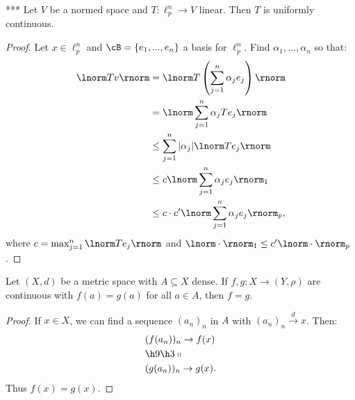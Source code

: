     \begin{corollary}***
        Let $V$ be a normed space and $T:\ell_p^n \rightarrow V$ linear. Then $T$ is uniformly continuous.
    \end{corollary}
        \begin{proof}
            Let $x \in \ell_p^n$ and $\cB = \{e_1,...,e_n\}$ a basis for $\ell_p^n$. Find $\alpha_1,...,\alpha_n$ so that:
                \begin{equation*}
                \begin{split}
                    \lnorm Tv \rnorm
                    & = \lnorm T \left( \sum_{j = 1}^n \alpha_j e_j \right) \rnorm \\
                    & = \lnorm \sum_{j = 1}^n  \alpha_j Te_j\rnorm \\
                    & \leq \sum_{j = 1}^n |\alpha_j| \lnorm T e_j \rnorm \\
                    & \leq c \lnorm \sum_{j = 1}^n \alpha_j e_j \rnorm_1 \\
                    & \leq c \cdot c' \lnorm \sum_{j = 1}^n \alpha_j e_j \rnorm_p,
                \end{split}
                \end{equation*}
            where $c = \max_{j = 1}^n \lnorm Te_j \rnorm$ and $\lnorm \cdot \rnorm_1 \leq c' \lnorm \cdot \rnorm_p$.
        \end{proof}

    \begin{proposition}
        Let $(X,d)$ be a metric space with $A \subseteq X$ dense. If $f,g :X \rightarrow (Y,\rho)$ are continuous with $f(a) = g(a)$ for all $a \in A$, then $f = g$.
    \end{proposition}
        \begin{proof}
            If $x \in X$, we can find a sequence $(a_n)_n$ in $A$ with $(a_n)_n \xrightarrow{d} x$. Then:
                \begin{equation*}
                \begin{split}
                    &(f(a_n))_n \rightarrow f(x) \\
                    & \h9\h3\shortparallel \\
                    & (g(a_n))_n \rightarrow g(x).
                \end{split}
                \end{equation*}
            Thus $f(x) = g(x)$.
        \end{proof}

